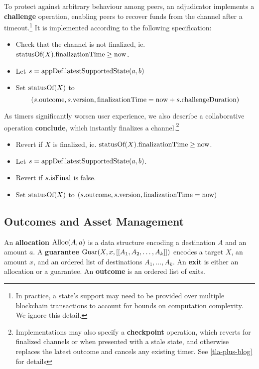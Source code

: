 To protect against arbitrary behaviour among peers, an adjudicator implements a \textbf{challenge} operation, enabling peers to recover funds from the channel after a timeout.\footnote{In practice, a state's support may need to be provided over multiple blockchain transactions to account for bounds on computation complexity. We ignore this detail.} It is implemented according to the following specification:
\begin{itemize}
  \item Check that the channel is not finalized, ie. $\mbox{statusOf}(X).\mbox{finalizationTime} \ge \mbox{now}$.
  \item Let $s = \mbox{appDef}.\mbox{latestSupportedState}(a, b)$
  \item Set $\mbox{statusOf}(X)$ to $$(s.\mbox{outcome}, s.\mbox{version}, \mbox{finalizationTime} = \mbox{now} + s.\mbox{challengeDuration})$$
\end{itemize}


As timers significantly worsen user experience, we also describe a collaborative operation \textbf{conclude}, which instantly finalizes a channel.\footnote{Implementations may also specify a \textbf{checkpoint} operation, which reverts for finalized channels or when presented with a stale state, and otherwise replaces the latest outcome and cancels any existing timer. See \ref{tla-plus-blog} for details}
\begin{itemize}
  \item Revert if $X$ is finalized, ie. $\mbox{statusOf}(X).\mbox{finalizationTime} \ge \mbox{now}$.
  \item Let $s = \mbox{appDef}.\mbox{latestSupportedState}(a, b)$. 
  \item Revert if $s.\mbox{isFinal}$ is false.
  \item Set $\mbox{statusOf}(X)$ to $(s.\mbox{outcome}, s.\mbox{version}, \mbox{finalizationTime} = \mbox{now})$
\end{itemize}

\subsection{Outcomes and Asset Management}\label{sec:outcomes}

An \textbf{allocation} $\mbox{Alloc}(A, a)$ is a data structure encoding a destination $A$ and an amount $a$.
A \textbf{guarantee} $\mbox{Guar}(X, x, [[A_1, A_2, \ldots, A_k]])$ encodes a target $X$, an amount $x$, and an ordered list of destinations $A_1, \ldots, A_k$.
An \textbf{exit} is either an allocation or a guarantee.
An \textbf{outcome} is an ordered list of exits.

